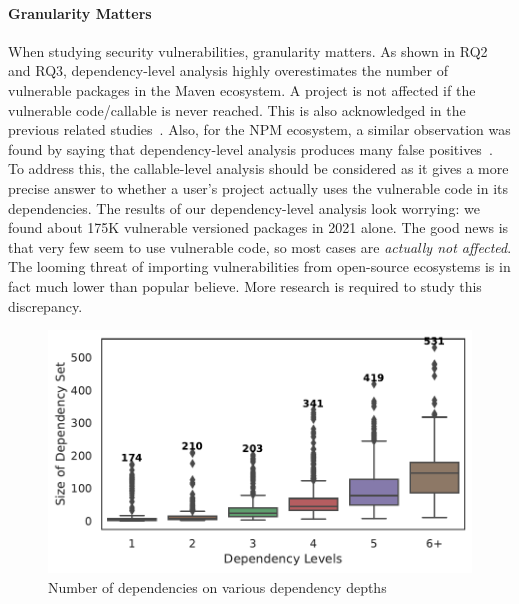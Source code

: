 \paragraph{Granularity Matters}
When studying security vulnerabilities, granularity matters.
As shown in RQ2 and RQ3, dependency-level analysis highly overestimates the number of vulnerable packages in the Maven ecosystem.
A project is not affected if the vulnerable code/callable is never reached. This is also acknowledged in the previous related studies~\cite{decan2018impact,liu2022demystifying}. Also, for the NPM ecosystem, a similar observation was found by saying that dependency-level analysis produces many false positives~\cite{zapata2018towards}. To address this,
the callable-level analysis should be considered as it gives a more precise answer to whether a user's project actually uses the vulnerable code in its dependencies.
The results of our dependency-level analysis look worrying: we found about 175K vulnerable versioned packages in 2021 alone.
The good news is that very few seem to use vulnerable code, so most cases are \emph{actually not affected}.
The looming threat of importing vulnerabilities from open-source ecosystems is in fact much lower than popular believe.
More research is required to study this discrepancy.

\begin{figure}
    \includegraphics[width=0.8\linewidth]{chapters/ch3/figs/num_deps_levels.pdf}
    \caption{Number of dependencies on various dependency depths}%
    \label{ch3:fig:num_deps_levels}
\end{figure}

